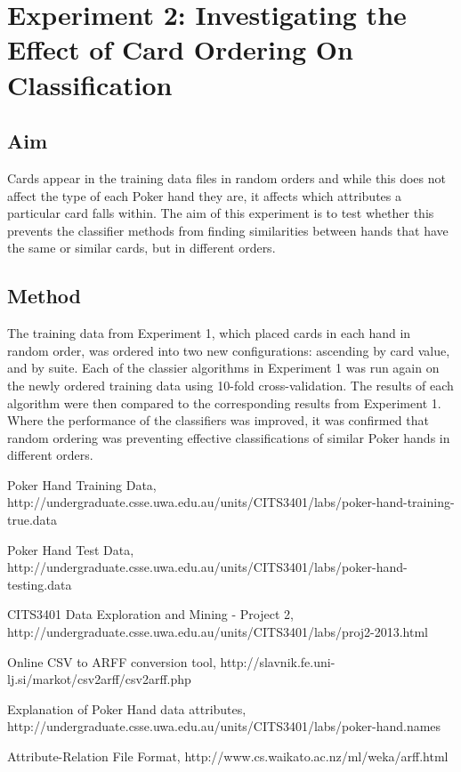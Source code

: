 \documentclass[11pt, a4paper]{article}
\begin{document}
\section*{Experiment 2: Investigating the Effect of Card Ordering On Classification}

\subsection*{Aim}

Cards appear in the training data files in random orders and while this does not affect the type of each Poker hand they are, it affects which attributes a particular card falls within. The aim of this experiment is to test whether this prevents the classifier methods from finding similarities between hands that have the same or similar cards, but in different orders.

\subsection*{Method}

The training data from Experiment 1, which placed cards in each hand in random order, was ordered into two new configurations: ascending by card value, and by suite. Each of the classier algorithms in Experiment 1 was run again on the newly ordered training data using 10-fold cross-validation. The results of each algorithm were then compared to the corresponding results from Experiment 1. Where the performance of the classifiers was improved, it was confirmed that random ordering was preventing effective classifications of similar Poker hands in different orders.

\begin{thebibliography}{9}

	Poker Hand Training Data,	
	http://undergraduate.csse.uwa.edu.au/units/CITS3401/labs/poker-hand-training-true.data
	
	Poker Hand Test Data,	
	http://undergraduate.csse.uwa.edu.au/units/CITS3401/labs/poker-hand-testing.data
	
	CITS3401 Data Exploration and Mining - Project 2,
	http://undergraduate.csse.uwa.edu.au/units/CITS3401/labs/proj2-2013.html

	Online CSV to ARFF conversion tool,
	http://slavnik.fe.uni-lj.si/markot/csv2arff/csv2arff.php

	Explanation of Poker Hand data attributes,
	http://undergraduate.csse.uwa.edu.au/units/CITS3401/labs/poker-hand.names

	Attribute-Relation File Format,
	http://www.cs.waikato.ac.nz/ml/weka/arff.html

\end{thebibliography}
\end{document}
